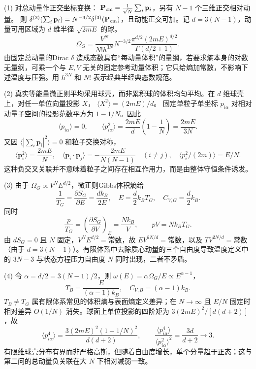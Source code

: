 (1) 对总动量作正交坐标变换：
\(\mathbf P_{\rm cm}=\frac1{\sqrt N}\sum_i\mathbf p_i\)，另有 \(N-1\) 个三维正交相对动量。
则 \(\delta^{(3)}(\sum_i\mathbf p_i)=N^{-3/2}\delta^{(3)}(\mathbf P_{\rm cm})\)，且动能正交可加。记 \(d=3(N-1)\)，动量可用区域为 \(d\) 维半径 \(\sqrt{2mE}\) 的球。
\[
\boxed{\Omega_G=\frac{V^N}{N!h^{3N}}N^{-3/2}
\frac{\pi^{d/2}(2mE)^{d/2}}{\Gamma(d/2+1)} }.
\]
由固定总动量的Dirac \(\delta\) 造成态数具有“每动量体积”的量纲，若要求熵本身的对数无量纲，可乘一个与 \(E,V\) 无关的固定参考动量体积；它只给熵加常数，不影响下述温度与压强。用 \(h^{3N}\) 和 \(N!\) 表示经典半经典态数规范。

(2) 真实等能量微正则平均采用球壳，而非累积球的体积均匀平均。在 \(d\) 维球壳上，对任一单位向量投影 \(X\)，
\(\langle X^2\rangle=(2mE)/d\)。
固定单粒子单坐标 \(p_{i\alpha}\) 对相对动量子空间的投影范数平方为 \(1-1/N\)。因此
\[
\langle p_{i\alpha}\rangle=0,\qquad
\langle p_{i\alpha}^2\rangle=\frac{2mE}{d}\left(1-\frac1N\right)=\frac{2mE}{3N}.
\]
又因 \(\langle|\sum_i\mathbf p_i|^2\rangle=0\) 和粒子交换对称，
\[
\langle\mathbf p_i^2\rangle=\frac{2mE}{N},\quad
\langle\mathbf p_i\cdot\mathbf p_j\rangle=-\frac{2mE}{N(N-1)}\quad(i\ne j),
\quad \langle p_i^2/(2m)\rangle=E/N.
\]
这种负交叉关联并不意味着粒子之间存在相互作用力，而是由整体守恒条件诱发。

(3) 由于 \(\Omega_G\propto V^N E^{d/2}\)，微正则Gibbs体积熵给
\[
\frac1{T_G}=\frac{\partial S_G}{\partial E}=\frac{d k_B}{2E},
\quad E=\frac d2 k_BT_G,\quad C_{V,G}=\frac d2 k_B.
\]
同时
\[
\frac p{T_G}=\left(\frac{\partial S_G}{\partial V}\right)_E
=\frac{Nk_B}{V},\qquad pV=Nk_BT_G.
\]
由 \(dS_G=0\) 且 \(N\) 固定，\(V^N E^{d/2}=\)常数，故
\(EV^{2N/d}=\)常数，以及
\(TV^{2N/d}=\)常数（由于 \(d=3(N-1)\)）。有限体系中去除质心动量的三个自由度导致温度定义中的 \(3N-3\) 与状态方程压力自由度 \(N\) 同时出现，二者不矛盾。

(4) 令 \(\alpha=d/2=3(N-1)/2\)，则
\(\omega(E)=\alpha\Omega_G/E\propto E^{\alpha-1}\)，
\[
T_B=\frac{E}{(\alpha-1)k_B},\quad
C_{V,B}=(\alpha-1)k_B.
\]
\(T_B\ne T_G\) 属有限体系常见的体积熵与表面熵定义差异；在 \(N\to\infty\) 且 \(E/N\) 固定时相对差异 \(O(1/N)\) 消失。球面上单位投影的四阶矩为 \(3(2mE)^2/[d(d+2)]\)，故
\[
\langle p_{i\alpha}^4\rangle=
\frac{3(2mE)^2(1-1/N)^2}{d(d+2)},\qquad
\frac{\langle p_{i\alpha}^4\rangle}{\langle p_{i\alpha}^2\rangle^2}
=\frac{3d}{d+2}\longrightarrow3.
\]
有限维球壳分布有界而非严格高斯，但随着自由度增长，单个分量趋于正态；这与第二问的总动量负关联在大 \(N\) 下相对减弱一致。
